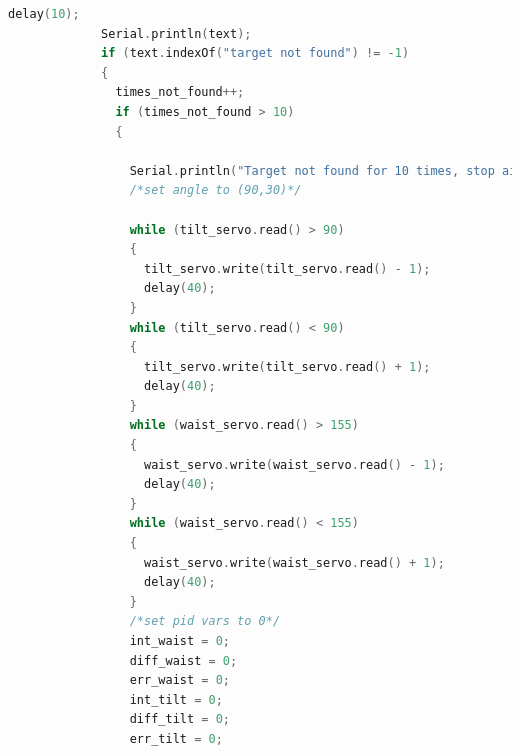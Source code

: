 \documentclass{article}
\begin{document}
\begin{lstlisting}[language=C,caption=main.c]
             delay(10);
             Serial.println(text);
             if (text.indexOf("target not found") != -1)
             {
               times_not_found++;
               if (times_not_found > 10)
               {
   
                 Serial.println("Target not found for 10 times, stop aiming.");
                 /*set angle to (90,30)*/
   
                 while (tilt_servo.read() > 90)
                 {
                   tilt_servo.write(tilt_servo.read() - 1);
                   delay(40);
                 }
                 while (tilt_servo.read() < 90)
                 {
                   tilt_servo.write(tilt_servo.read() + 1);
                   delay(40);
                 }
                 while (waist_servo.read() > 155)
                 {
                   waist_servo.write(waist_servo.read() - 1);
                   delay(40);
                 }
                 while (waist_servo.read() < 155)
                 {
                   waist_servo.write(waist_servo.read() + 1);
                   delay(40);
                 }
                 /*set pid vars to 0*/
                 int_waist = 0;
                 diff_waist = 0;
                 err_waist = 0;
                 int_tilt = 0;
                 diff_tilt = 0;
                 err_tilt = 0;
   

\end{lstlisting}
\end{document}
